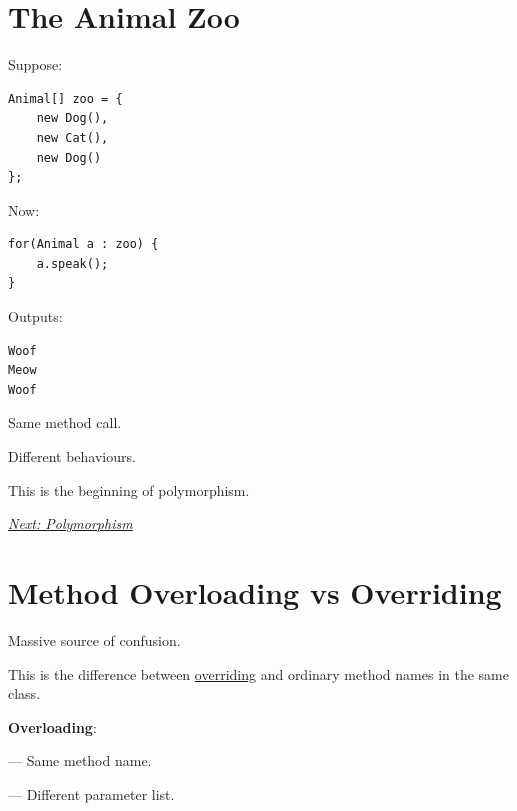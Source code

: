 \documentclass[11pt,a4paper]{book}
\begin{document}
\section{The Animal Zoo}

Suppose:

\begin{verbatim}
Animal[] zoo = {
    new Dog(),
    new Cat(),
    new Dog()
};
\end{verbatim}


Now:

\begin{verbatim}
for(Animal a : zoo) {
    a.speak();
}
\end{verbatim}


Outputs:

\begin{verbatim}
Woof
Meow
Woof
\end{verbatim}


Same method call.

Different behaviours.


This is the beginning of polymorphism.

\smallskip
\noindent
\hyperref[chap:polymorphism]{\emph{Next: Polymorphism}}


\section{Method Overloading vs Overriding}\label{sec:overloading_vs_overriding}

Massive source of confusion.

This is the difference between \hyperref[sec:method_overriding]{overriding} and ordinary method names in the same class.


\textbf{Overloading}:

--- Same \textcolor{RosettaSeaGreen}{method name}.

--- Different \textcolor{RosettaRoyalPurple}{parameter list}.
\end{document}
